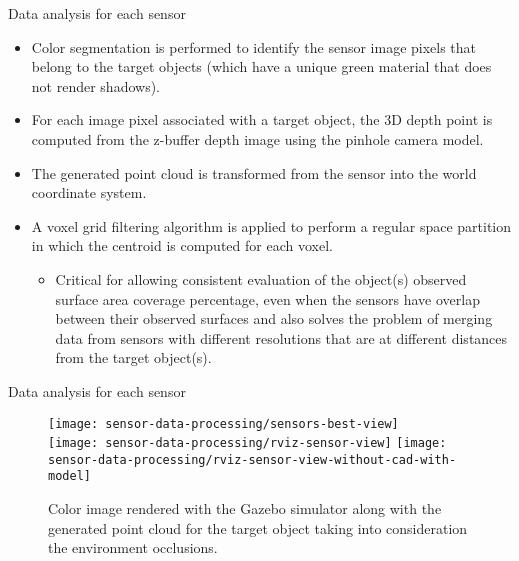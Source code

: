 \begin{frame}{Data analysis for each sensor}
		\begin{itemize}
			\item Color segmentation is performed to identify the sensor image pixels that belong to the target objects (which have a unique green material that does not render shadows).
			\item For each image pixel associated with a target object, the 3D depth point is computed from the z-buffer depth image using the pinhole camera model.
			\item The generated point cloud is transformed from the sensor into the world coordinate system.
			\item A voxel grid filtering algorithm is applied to perform a regular space partition in which the centroid is computed for each voxel.
			\begin{itemize}
				\item Critical for allowing consistent evaluation of the object(s) observed surface area coverage percentage, even when the sensors have overlap between their observed surfaces and also solves the problem of merging data from sensors with different resolutions that are at different distances from the target object(s).
			\end{itemize}
		\end{itemize}
\end{frame}


\begin{frame}{Data analysis for each sensor}
	\begin{figure}
		\centering
		\texttt{[image: sensor-data-processing/sensors-best-view]}\\
		\vspace{0.5em}
		\texttt{[image: sensor-data-processing/rviz-sensor-view]}\hspace{2em}
		\texttt{[image: sensor-data-processing/rviz-sensor-view-without-cad-with-model]}
		\caption{Color image rendered with the Gazebo simulator along with the generated point cloud for the target object taking into consideration the environment occlusions.}
	\end{figure}
\end{frame}


